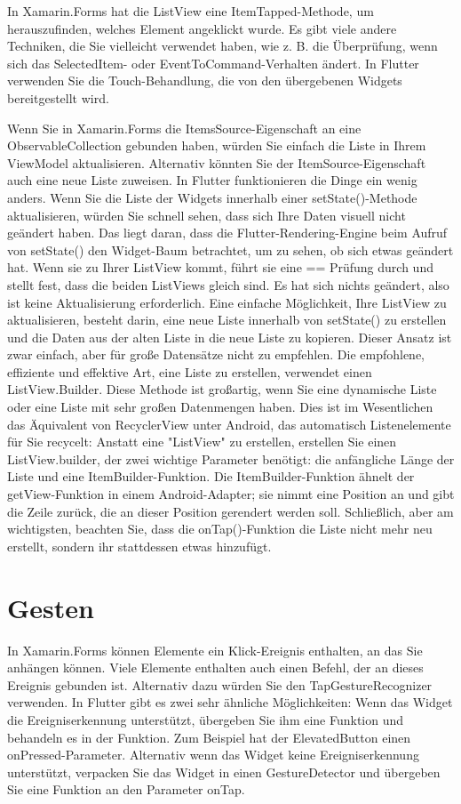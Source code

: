 In Xamarin.Forms hat die ListView eine ItemTapped-Methode, um herauszufinden, welches Element angeklickt wurde. Es gibt viele andere Techniken, die Sie vielleicht verwendet haben, wie z. B. die Überprüfung, wenn sich das SelectedItem- oder EventToCommand-Verhalten ändert. In Flutter verwenden Sie die Touch-Behandlung, die von den übergebenen Widgets bereitgestellt wird.

Wenn Sie in Xamarin.Forms die ItemsSource-Eigenschaft an eine ObservableCollection gebunden haben, würden Sie einfach die Liste in Ihrem ViewModel aktualisieren. Alternativ könnten Sie der ItemSource-Eigenschaft auch eine neue Liste zuweisen. In Flutter funktionieren die Dinge ein wenig anders. Wenn Sie die Liste der Widgets innerhalb einer setState()-Methode aktualisieren, würden Sie schnell sehen, dass sich Ihre Daten visuell nicht geändert haben. Das liegt daran, dass die Flutter-Rendering-Engine beim Aufruf von setState() den Widget-Baum betrachtet, um zu sehen, ob sich etwas geändert hat. Wenn sie zu Ihrer ListView kommt, führt sie eine == Prüfung durch und stellt fest, dass die beiden ListViews gleich sind. Es hat sich nichts geändert, also ist keine Aktualisierung erforderlich. Eine einfache Möglichkeit, Ihre ListView zu aktualisieren, besteht darin, eine neue Liste innerhalb von setState() zu erstellen und die Daten aus der alten Liste in die neue Liste zu kopieren. Dieser Ansatz ist zwar einfach, aber für große Datensätze nicht zu empfehlen. Die empfohlene, effiziente und effektive Art, eine Liste zu erstellen, verwendet einen ListView.Builder. Diese Methode ist großartig, wenn Sie eine dynamische Liste oder eine Liste mit sehr großen Datenmengen haben. Dies ist im Wesentlichen das Äquivalent von RecyclerView unter Android, das automatisch Listenelemente für Sie recycelt:
Anstatt eine "ListView" zu erstellen, erstellen Sie einen ListView.builder, der zwei wichtige Parameter benötigt: die anfängliche Länge der Liste und eine ItemBuilder-Funktion. Die ItemBuilder-Funktion ähnelt der getView-Funktion in einem Android-Adapter; sie nimmt eine Position an und gibt die Zeile zurück, die an dieser Position gerendert werden soll. Schließlich, aber am wichtigsten, beachten Sie, dass die onTap()-Funktion die Liste nicht mehr neu erstellt, sondern ihr stattdessen etwas hinzufügt.



\section{Gesten}
In Xamarin.Forms können Elemente ein Klick-Ereignis enthalten, an das Sie anhängen können. Viele Elemente enthalten auch einen Befehl, der an dieses Ereignis gebunden ist. Alternativ dazu würden Sie den TapGestureRecognizer verwenden. In Flutter gibt es zwei sehr ähnliche Möglichkeiten: Wenn das Widget die Ereigniserkennung unterstützt, übergeben Sie ihm eine Funktion und behandeln es in der Funktion. Zum Beispiel hat der ElevatedButton einen onPressed-Parameter. Alternativ wenn das Widget keine Ereigniserkennung unterstützt, verpacken Sie das Widget in einen GestureDetector und übergeben Sie eine Funktion an den Parameter onTap.

